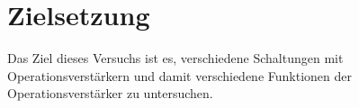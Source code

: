 \section{Zielsetzung}
Das Ziel dieses Versuchs ist es, verschiedene Schaltungen mit Operationsverstärkern und damit 
verschiedene Funktionen der Operationsverstärker zu untersuchen. 